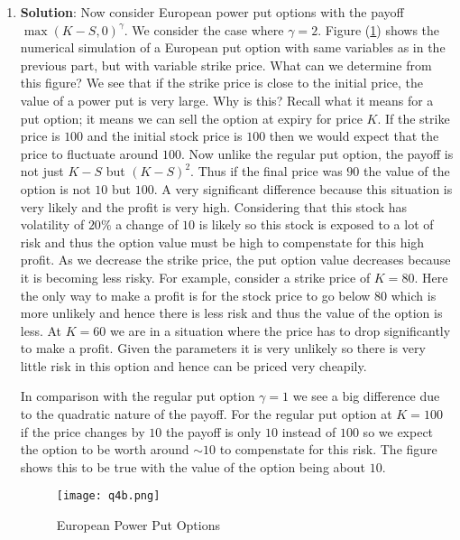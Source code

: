 \documentclass[10pt,english]{article}
\theoremstyle{plain}
\begin{document}
\begin{enumerate}
\begin{enumerate}
\item \textbf{Solution}: Now consider European power put options with the payoff $\max(K-S,0)^{\gamma}$. We consider the case where $\gamma=2$. Figure (\ref{pp}) shows the numerical simulation of a European put option with same variables as in the previous part, but with variable strike price. What can we determine from this figure? We see that if the strike price is close to the initial price, the value of a power put is very large. Why is this? Recall what it means for a put option; it means we can sell the option at expiry for price $K$. If the strike price is $100$ and the initial stock price is $100$ then we would expect that the price to fluctuate around $100$. Now unlike the regular put option, the payoff is not just $K-S$ but $(K-S)^{2}$. Thus if the final price was $90$ the value of the option is not $10$ but $100$. A very significant difference because this situation is very likely and the profit is very high. Considering that this stock has volatility of $20\%$ a change of $10$ is likely so  this stock is exposed to a lot of risk and thus the option value must be high to compenstate for this high profit. As we decrease the strike price, the put option value decreases because it is becoming less risky. For example, consider a strike price of $K=80$. Here the only way to make a profit is for the stock price to go below $80$ which is more unlikely and hence there is less risk and thus the value of the option is less. At $K=60$ we are in a situation where the price has to drop significantly to make a profit. Given the parameters it is very unlikely so there is very little risk in this option and hence can be priced very cheapily.

In comparison with the regular put option $\gamma=1$ we see a big difference due to the quadratic nature of the payoff. For the regular put option at $K=100$ if the price changes by $10$ the payoff is only $10$ instead of $100$ so we expect the option to be worth around $\sim 10$ to compenstate for this risk. The figure shows this to be true with the value of the option being about $10$. 
\begin{figure}

\begin{center}
\texttt{[image: q4b.png]}
\end{center}
\caption{European Power Put Options}\label{pp}
\end{figure}
\end{enumerate}


\end{enumerate}
\end{document}
